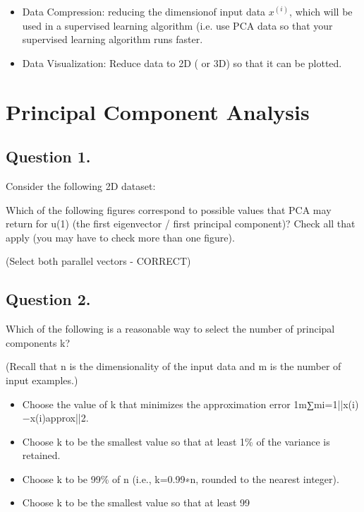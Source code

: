 \begin{itemize}
\item Data Compression: reducing the dimensionof input data $x^{(i)}$, which will be used in a supervised learning algorithm
(i.e. use PCA data so that your supervised learning algorithm runs faster.

\item Data Visualization: Reduce data to 2D ( or 3D) so that it can be plotted.
\end{itemize}

\section{Principal Component Analysis}


\subsection{ Question 1. }

Consider the following 2D dataset:


Which of the following figures correspond to possible values that PCA may return for u(1) (the first eigenvector / first principal component)? 
Check all that apply (you may have to check more than one figure).

(Select both parallel vectors - CORRECT)








\subsection{ Question 2. }
Which of the following is a reasonable way to select the number of principal components k?

(Recall that n is the dimensionality of the input data and m is the number of input examples.)

\begin{itemize}
\item Choose the value of k that minimizes the approximation error 1m∑mi=1||x(i)−x(i)approx||2.

\item Choose k to be the smallest value so that at least 1\% of the variance is retained.

\item Choose k to be 99\% of n (i.e., k=0.99∗n, rounded to the nearest integer).

\item Choose k to be the smallest value so that at least 99%

\end{itemize}
